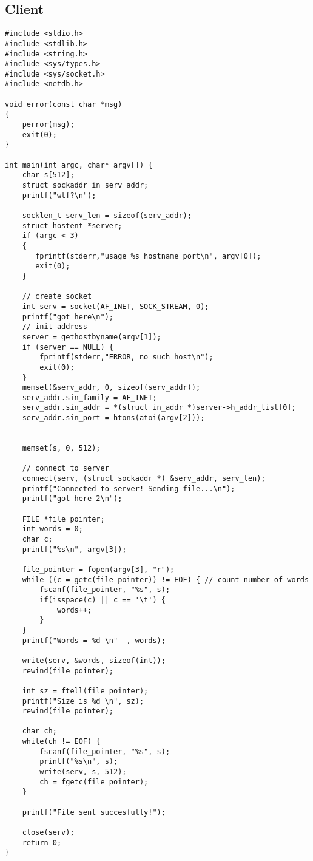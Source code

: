 \documentclass{article}
\begin{document}
\subsection{Client}
\begin{lstlisting}
#include <stdio.h>
#include <stdlib.h>
#include <string.h>
#include <sys/types.h>
#include <sys/socket.h>
#include <netdb.h>

void error(const char *msg)
{
    perror(msg);
    exit(0);
}

int main(int argc, char* argv[]) {
    char s[512];
    struct sockaddr_in serv_addr;
    printf("wtf?\n");

    socklen_t serv_len = sizeof(serv_addr);
    struct hostent *server;
    if (argc < 3)
    {
       fprintf(stderr,"usage %s hostname port\n", argv[0]);
       exit(0);
    }

    // create socket
    int serv = socket(AF_INET, SOCK_STREAM, 0);
    printf("got here\n");
    // init address
    server = gethostbyname(argv[1]);
    if (server == NULL) {
        fprintf(stderr,"ERROR, no such host\n");
        exit(0);
    }
    memset(&serv_addr, 0, sizeof(serv_addr));
    serv_addr.sin_family = AF_INET;
    serv_addr.sin_addr = *(struct in_addr *)server->h_addr_list[0];
    serv_addr.sin_port = htons(atoi(argv[2]));


    memset(s, 0, 512);

    // connect to server
    connect(serv, (struct sockaddr *) &serv_addr, serv_len);
    printf("Connected to server! Sending file...\n");
    printf("got here 2\n");

    FILE *file_pointer;
    int words = 0;
    char c;
    printf("%s\n", argv[3]);
    
    file_pointer = fopen(argv[3], "r");
    while ((c = getc(file_pointer)) != EOF) { // count number of words
        fscanf(file_pointer, "%s", s);
        if(isspace(c) || c == '\t') {
            words++;
        }
    }
    printf("Words = %d \n"  , words);

    write(serv, &words, sizeof(int));
    rewind(file_pointer);

    int sz = ftell(file_pointer);
    printf("Size is %d \n", sz);
    rewind(file_pointer);

    char ch;
    while(ch != EOF) {
        fscanf(file_pointer, "%s", s);
        printf("%s\n", s);
        write(serv, s, 512);
        ch = fgetc(file_pointer);
    }

    printf("File sent succesfully!");
    
    close(serv);
    return 0;
}
\end{lstlisting}
\end{document}
